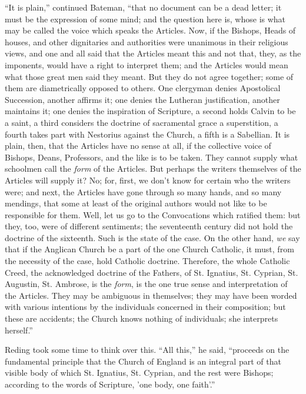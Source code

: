 ``It is plain,'' continued Bateman, ``that no document
can be a dead letter; it must be the expression of some mind; and the
question here is, whose is what may be called the voice which speaks
the Articles. Now, if the Bishops, Heads of houses, and other
dignitaries and authorities were unanimous in their religious views,
and one and all said that the Articles meant this and not that, they,
as the imponents, would have a right to interpret them; and the
Articles would mean what those great men said they meant. But they do
not agree together; some of them are diametrically opposed to others.
One clergyman denies Apostolical Succession, another affirms it; one
denies the Lutheran justification, another maintains it; one denies
the inspiration of Scripture, a second holds Calvin to be a saint, a
third considers the doctrine of sacramental grace a superstition, a
fourth takes part with Nestorius against the Church, a fifth is a
Sabellian. It is plain, then, that the Articles have no sense at all,
if the collective voice of Bishops, Deans, Professors, and the like is
to be taken. They cannot supply what schoolmen call the \emph{form} of the
Articles. But perhaps the writers themselves of the Articles will
supply it? No; for, first, we don't know for certain who the
writers were; and next, the Articles have gone through so many hands,
and so many mendings, that some at least of the original authors would
not like to be responsible for them. Well, let us go to the
Convocations which ratified them: but they, too, were of different
sentiments; the seventeenth century did not hold the doctrine of the
sixteenth. Such is the state of the case. On the other hand, \emph{we}
say that if the Anglican Church be a part of the one Church Catholic,
it must, from the necessity of the case, hold Catholic doctrine.
Therefore, the whole Catholic Creed, the acknowledged doctrine of the
Fathers, of St. Ignatius, St. Cyprian, St. Augustin, St. Ambrose, is
the \emph{form}, is the one true sense and interpretation of the
Articles. They may be ambiguous in themselves; they may have been
worded with various intentions by the individuals concerned in their
composition; but these are accidents; the Church knows nothing of
individuals; she interprets herself.''

Reding took some time to think over this. ``All this,'' he
said, ``proceeds on the fundamental principle that the Church of
England is an integral part of that visible body of which St.
Ignatius, St. Cyprian, and the rest were Bishops; according to the
words of Scripture, 'one body, one faith'.''

